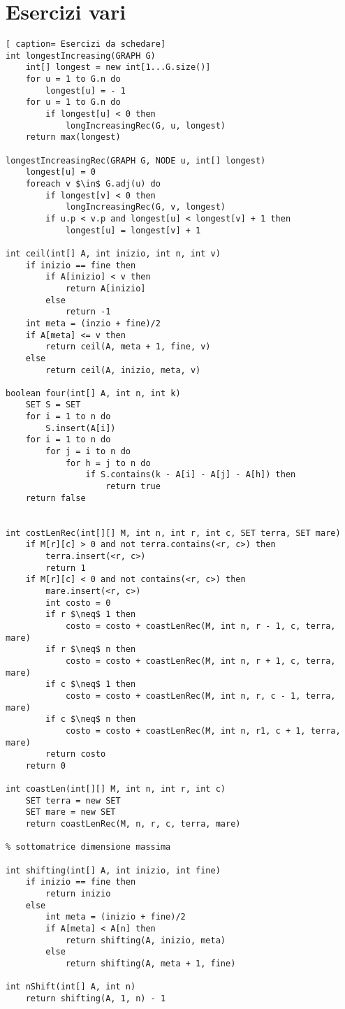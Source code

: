 \documentclass[../cheatSheetAlgoritmi.tex]{subfiles}
\begin{document}
\section{Esercizi vari}
\begin{lstlisting}[ caption= Esercizi da schedare]
int longestIncreasing(GRAPH G)
	int[] longest = new int[1...G.size()]
  	for u = 1 to G.n do
    	longest[u] = - 1
  	for u = 1 to G.n do
    	if longest[u] < 0 then
      		longIncreasingRec(G, u, longest)
  	return max(longest)

longestIncreasingRec(GRAPH G, NODE u, int[] longest)
	longest[u] = 0
  	foreach v $\in$ G.adj(u) do
    	if longest[v] < 0 then
      		longIncreasingRec(G, v, longest)
    	if u.p < v.p and longest[u] < longest[v] + 1 then
   			longest[u] = longest[v] + 1

int ceil(int[] A, int inizio, int n, int v)
	if inizio == fine then
    	if A[inizio] < v then
     		return A[inizio]
    	else
      		return -1
  	int meta = (inzio + fine)/2
  	if A[meta] <= v then
    	return ceil(A, meta + 1, fine, v)
  	else
    	return ceil(A, inizio, meta, v)

boolean four(int[] A, int n, int k) 
	SET S = SET
  	for i = 1 to n do 
    	S.insert(A[i])
  	for i = 1 to n do 
    	for j = i to n do 
      		for h = j to n do 
        		if S.contains(k - A[i] - A[j] - A[h]) then 
          			return true
  	return false
  

int costLenRec(int[][] M, int n, int r, int c, SET terra, SET mare)
	if M[r][c] > 0 and not terra.contains(<r, c>) then 
    	terra.insert(<r, c>)
    	return 1
  	if M[r][c] < 0 and not contains(<r, c>) then
    	mare.insert(<r, c>)
    	int costo = 0
    	if r $\neq$ 1 then
      		costo = costo + coastLenRec(M, int n, r - 1, c, terra, mare)
    	if r $\neq$ n then
      		costo = costo + coastLenRec(M, int n, r + 1, c, terra, mare)
    	if c $\neq$ 1 then
      		costo = costo + coastLenRec(M, int n, r, c - 1, terra, mare)
    	if c $\neq$ n then
      		costo = costo + coastLenRec(M, int n, r1, c + 1, terra, mare)
    	return costo
 	return 0

int coastLen(int[][] M, int n, int r, int c)
	SET terra = new SET
  	SET mare = new SET
  	return coastLenRec(M, n, r, c, terra, mare)
  
% sottomatrice dimensione massima

int shifting(int[] A, int inizio, int fine)
	if inizio == fine then
    	return inizio
  	else
    	int meta = (inizio + fine)/2
    	if A[meta] < A[n] then
      		return shifting(A, inizio, meta)
    	else
      		return shifting(A, meta + 1, fine)

int nShift(int[] A, int n)
	return shifting(A, 1, n) - 1
\end{lstlisting}
 
\end{document}
